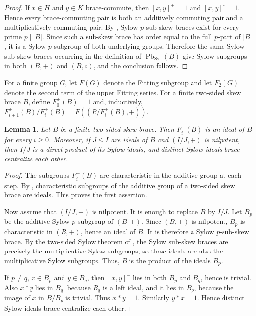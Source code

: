 \documentclass[10pt,a4paper]{amsart}
\numberwithin{equation}{section}
\newtheorem{lem}[equation]{Lemma}
\newcommand{\Pb}{\operatorname{Pb} }
\newcommand{\Syl}{\operatorname{Syl} }
\begin{document}
\begin{proof}
If $x\in H$ and $y\in K$ brace-commute, then $[x,y]^+=1$ and
$[x,y]^\circ=1$. Hence every brace-commuting pair is both an additively
commuting pair and a multiplicatively commuting pair. By \cite{Tru26}, Sylow $p$-sub-skew braces exist for every prime $p \mid |B|$. Since such a sub-skew brace has order equal to the full $p$-part of $|B|$, it is a Sylow $p$-subgroup of both underlying groups. Therefore the same Sylow sub-skew braces occurring in the definition of $\Pb_{\Syl}(B)$ give Sylow subgroups in both $(B,+)$ and $(B,\circ)$, and the conclusion follows.
\end{proof}

For a finite group $G$, let $F(G)$ denote the Fitting subgroup and let
$F_2(G)$ denote the second term of the upper Fitting series. For a finite
two-sided skew brace $B$, define $F^+_0(B)= 1$ and, inductively,
$F^+_{i+1}(B)/F^+_i(B)=F((B/F^+_i(B),+))$.

\begin{lem}\label{lem:additive-fitting-ideals-sylow}
Let $B$ be a finite two-sided skew brace. Then $F^+_i(B)$ is an ideal of
$B$ for every $i\geqslant 0$. Moreover, if $J\leqslant I$ are ideals of $B$ and
$(I/J,+)$ is nilpotent, then $I/J$ is a direct product of its Sylow ideals,
and distinct Sylow ideals brace-centralize each other.
\end{lem}

\begin{proof}
The subgroups $F^+_i(B)$ are characteristic in the additive group at each
step. By \cite[Lemma 4.1]{Nas19}, characteristic subgroups of the additive group of a two-sided skew brace are ideals. This proves
the first assertion.

Now assume that $(I/J,+)$ is nilpotent. It is enough to replace $B$ by
$I/J$. Let $B_p$ be the additive Sylow $p$-subgroup of $(B,+)$. Since
$(B,+)$ is nilpotent, $B_p$ is characteristic in $(B,+)$, hence an ideal of
$B$. It is therefore a Sylow $p$-sub-skew brace. By the two-sided Sylow
theorem of \cite[Theorem 14]{CDMFT26}, the Sylow sub-skew braces are
precisely the multiplicative Sylow subgroups, so these ideals are also the
multiplicative Sylow subgroups. Thus, $B$ is the product of the ideals
$B_p$.

If $p\neq q$, $x\in B_p$ and $y\in B_q$, then $[x,y]^+$ lies in both
$B_p$ and $B_q$, hence is trivial. Also $x*y$ lies in $B_q$, because $B_q$
is a left ideal, and it lies in $B_p$, because the image of $x$ in
$B/B_p$ is trivial. Thus $x*y= 1$. Similarly $y*x= 1$. Hence distinct Sylow
ideals brace-centralize each other.
\end{proof}
\end{document}
